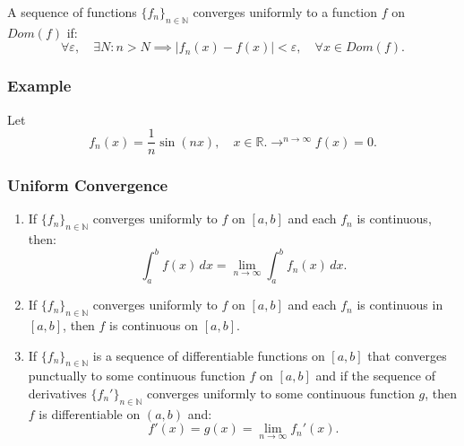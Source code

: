 \documentclass[11pt]{article}
\begin{document}
A sequence of functions \(\{f_n\}_{n \in \mathbb{N}}\) converges uniformly to a function \(f\) on \(Dom(f)\) if:
\[\forall \varepsilon, \quad \exists N : n > N \implies |f_n(x) - f(x)| < \varepsilon, \quad \forall x \in Dom(f).\]

\subsubsection*{Example}
Let
\[f_n(x) = \frac{1}{n} \sin(nx), \quad x \in \mathbb{R}. \rightarrow^{n\to\infty} f(x) = 0.\]

\begin{center}
\end{center}

\subsubsection{Uniform Convergence}
\begin{enumerate}
    \item If \(\{f_n\}_{n \in \mathbb{N}}\) converges uniformly to \(f\) on \([a, b]\) and each \(f_n\) is continuous, then:
        \[\int_a^b f(x) \, dx = \lim_{n \to \infty} \int_a^b f_n(x) \, dx.\]
    \item If \(\{f_n\}_{n \in \mathbb{N}}\) converges uniformly to \(f\) on \([a, b]\) and each \(f_n\) is continuous in \([a, b]\), then \(f\) is continuous on \([a, b]\).
    \item If \(\{f_n\}_{n \in \mathbb{N}}\) is a sequence of differentiable functions on \([a, b]\) that converges punctually to some continuous function \(f\) on \([a, b]\) and if the sequence of derivatives \(\{f_n'\}_{n \in \mathbb{N}}\) converges uniformly to some continuous function \(g\), then \(f\) is differentiable on \((a, b)\) and:
        \[f'(x) = g(x) = \lim_{n \to \infty} f_n'(x).\]
\end{enumerate}
\end{document}
